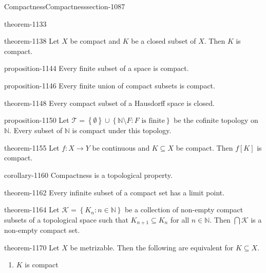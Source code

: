 \documentclass[oneside,10pt,]{article}
\newcommand{\mb}{\mathbb}
\newcommand{\mc}{\mathcal}
\newcommand{\setBuilder}[2]{\left\{#1:#2\right\}}
\newcommand{\setList}[1]{\left\{#1\right\}}
\begin{document}
\begin{sectionptx}{Compactness}{}{Compactness}{}{}{section-1087}
\begin{theorem}{}{}{theorem-1133}
\end{theorem}
\begin{theorem}{}{}{theorem-1138}%
\hypertarget{p-1139}{}%
Let \(X\) be compact and \(K\) be a closed subset of \(X\). Then \(K\) is compact.%
\end{theorem}
\begin{proposition}{}{}{proposition-1144}%
\hypertarget{p-1145}{}%
Every finite subset of a space is compact.%
\end{proposition}
\begin{proposition}{}{}{proposition-1146}%
\hypertarget{p-1147}{}%
Every finite union of compact subsets is compact.%
\end{proposition}
\begin{theorem}{}{}{theorem-1148}%
\hypertarget{p-1149}{}%
Every compact subset of a Hausdorff space is closed.%
\end{theorem}
\begin{proposition}{}{}{proposition-1150}%
\hypertarget{p-1151}{}%
Let \(\mc T=\setList{\emptyset}\cup
\setBuilder{\mb N\setminus F}{F\text{ is finite}}\) be the cofinite topology on \(\mb N\). Every subset of \(\mb N\) is compact under this topology.%
\end{proposition}
\begin{theorem}{}{}{theorem-1155}%
\hypertarget{p-1156}{}%
Let \(f:X\to Y\) be continuous and \(K\subseteq X\) be compact. Then \(f[K]\) is compact.%
\end{theorem}
\begin{corollary}{}{}{corollary-1160}%
\hypertarget{p-1161}{}%
Compactness is a topological property.%
\end{corollary}
\begin{theorem}{}{}{theorem-1162}%
\hypertarget{p-1163}{}%
Every infinite subset of a compact set has a limit point.%
\end{theorem}
\begin{theorem}{}{}{theorem-1164}%
\hypertarget{p-1165}{}%
Let \(\mc K=\setBuilder{K_n}{n\in\mb N}\) be a collection of non-empty compact subsets of a topological space such that \(K_{n+1}\subseteq K_n\) for all \(n\in\mb N\). Then \(\bigcap\mc K\) is a non-empty compact set.%
\end{theorem}
\begin{theorem}{}{}{theorem-1170}%
\hypertarget{p-1171}{}%
Let \(X\) be metrizable. Then the following are equivalent for \(K\subseteq X\).%
\leavevmode%
\begin{enumerate}
\item\hypertarget{li-1175}{}\(K\) is compact%

\end{enumerate}
\end{theorem}
\end{sectionptx}
\end{document}
